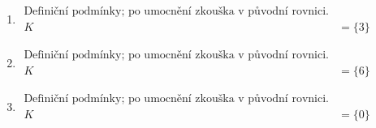 \documentclass[11pt,a4paper]{article}
\begin{document}
\begin{enumerate}[label={},itemsep=9pt]
\item[\textbf{F018}] \(\displaystyle \begin{aligned}\text{Definiční podmínky; po umocnění zkouška v původní rovnici.}\\K&=\{3\}\end{aligned}\)\par
\item[\textbf{F019}] \(\displaystyle \begin{aligned}\text{Definiční podmínky; po umocnění zkouška v původní rovnici.}\\K&=\{6\}\end{aligned}\)\par
\item[\textbf{F020}] \(\displaystyle \begin{aligned}\text{Definiční podmínky; po umocnění zkouška v původní rovnici.}\\K&=\{0\}\end{aligned}\)\par
\end{enumerate}
\end{document}
